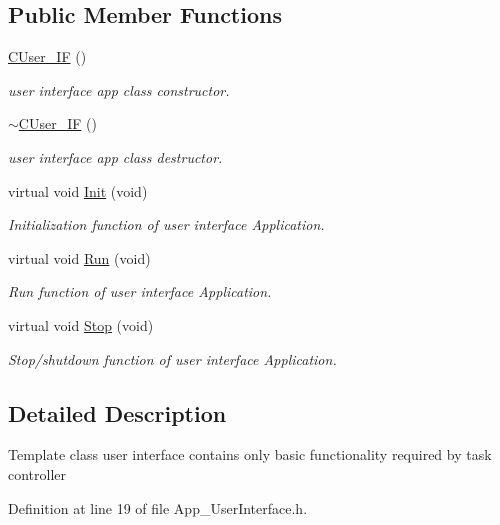 \subsection*{Public Member Functions}
\begin{DoxyCompactItemize}
\item 
\mbox{\hyperlink{class_c_user___i_f_a417b492fc7368c7d5dde59587f4b3e65}{C\+User\+\_\+\+IF}} ()
\begin{DoxyCompactList}\small\item\em user interface app class constructor. \end{DoxyCompactList}\item 
\mbox{\hyperlink{class_c_user___i_f_a35f3408f44d101a06e184311cab14cba}{$\sim$\+C\+User\+\_\+\+IF}} ()
\begin{DoxyCompactList}\small\item\em user interface app class destructor. \end{DoxyCompactList}\item 
virtual void \mbox{\hyperlink{class_c_user___i_f_a02c8bba754c77583dc5afaa6877dc547}{Init}} (void)
\begin{DoxyCompactList}\small\item\em Initialization function of user interface Application. \end{DoxyCompactList}\item 
virtual void \mbox{\hyperlink{class_c_user___i_f_a1be2e11cd5df5ad0fa5a74a0eb283ec5}{Run}} (void)
\begin{DoxyCompactList}\small\item\em Run function of user interface Application. \end{DoxyCompactList}\item 
virtual void \mbox{\hyperlink{class_c_user___i_f_ae241b3296f4dd7810897ed8631ede880}{Stop}} (void)
\begin{DoxyCompactList}\small\item\em Stop/shutdown function of user interface Application. \end{DoxyCompactList}\end{DoxyCompactItemize}


\subsection{Detailed Description}
Template class user interface contains only basic functionality required by task controller 

Definition at line 19 of file App\+\_\+\+User\+Interface.\+h.




